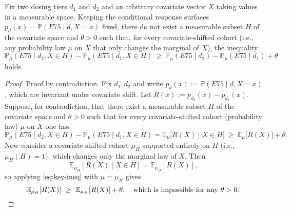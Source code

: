 ﻿\begin{theorem}\label{thm:impossibility-covshift}
Fix two dosing tiers $d_1$ and $d_2$ and an arbitrary covariate vector $X$ taking values in a measurable space. Keeping the conditional response surfaces $p_d(x)=\mathbb P(E75\mid d, X=x)$ fixed, there do not exist a measurable subset $H$ of the covariate space and $\theta>0$ such that, for every covariate-shifted cohort (i.e., any probability law $\mu$ on $X$ that only changes the marginal of $X$), the inequality
\[
\mathbb P_\mu(E75\mid d_2, X\in H)-\mathbb P_\mu(E75\mid d_1, X\in H)\ \ge\ \mathbb P_\mu(E75\mid d_2)-\mathbb P_\mu(E75\mid d_1)+\theta
\]
holds.
\end{theorem}

\begin{proof}
Proof by contradiction. Fix $d_1,d_2$ and write $p_d(x):=\mathbb P(E75\mid d, X{=}x)$, which are invariant under covariate shift. Let $R(x):=p_{d_2}(x)-p_{d_1}(x)$. Suppose, for contradiction, that there exist a measurable subset $H$ of the covariate space and $\theta>0$ such that for every covariate-shifted cohort (probability law) $\mu$ on $X$ one has
\begin{equation}\label{eq:key-ineq}
\mathbb P_\mu(E75\mid d_2, X\in H)-\mathbb P_\mu(E75\mid d_1, X\in H)
=\mathbb E_\mu\big[R(X)\mid X\in H\big]\ \ge\ \mathbb E_\mu\big[R(X)\big]+\theta.
\end{equation}
Now consider a covariate-shifted cohort $\mu_H$ supported entirely on $H$ (i.e., $\mu_H(H)=1$), which changes only the marginal law of $X$. Then
\[
\mathbb E_{\mu_H}[R(X)\mid X\in H]=\mathbb E_{\mu_H}[R(X)],
\]
so applying \eqref{eq:key-ineq} with $\mu=\mu_H$ gives
\[
\mathbb E_{\mu_H}[R(X)]\ \ge\ \mathbb E_{\mu_H}[R(X)]+\theta,\quad\text{which is impossible for any }\theta>0.\ \qedhere
\]
\end{proof}
